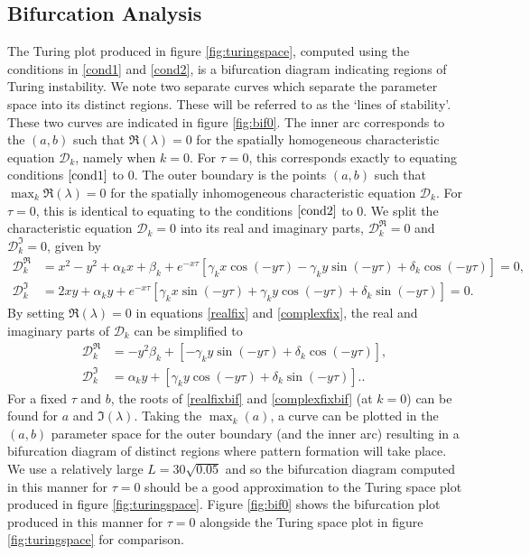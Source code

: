 \subsection{Bifurcation Analysis}\label{section:fixedbif}
The Turing plot produced in figure \ref{fig:turingspace}, computed using the conditions in \eqref{cond1} and \eqref{cond2}, is a bifurcation diagram indicating regions of Turing instability. We note two separate curves which separate the parameter space into its distinct regions. These will be referred to as the `lines of stability'.
These two curves are indicated in figure \ref{fig:bif0}. The inner arc corresponds to the $(a,b)$ such that $\Re(\lambda)=0$ for the
spatially homogeneous characteristic equation $\mathcal{D}_k$, namely when $k=0$. For $\tau=0$, this corresponds exactly to equating conditions $\eqref{cond1}$ to 0. The outer boundary is the points $(a,b)$ such that $\max_k\Re(\lambda)=0$ for the spatially inhomogeneous characteristic equation $\mathcal{D}_k$. For $\tau=0$, this is identical to equating to the conditions $\eqref{cond2}$ to 0. We split the characteristic equation $\mathcal{D}_k=0$ into its real and imaginary parts, $\mathcal{D}_k^{\Re}=0$ and $\mathcal{D}_k^{\Im}=0$, given by
\begin{align}\label{realfix}
\mathcal{D}_k^{\Re}&=x^2-y^2+\alpha_kx+\beta_k+e^{-x\tau}[\gamma_kx\cos(-y\tau)-\gamma_ky\sin(-y\tau)+\delta_k\cos(-y\tau)]=0,\\
\mathcal{D}_k^{\Im}&=2xy+\alpha_ky+e^{-x\tau}[\gamma_kx\sin(-y\tau)+\gamma_ky\cos(-y\tau)+\delta_k\sin(-y\tau)]=0.\label{complexfix}
\end{align}
By setting $\Re(\lambda)=0$ in equations \eqref{realfix} and \eqref{complexfix}, the real and imaginary parts of $\mathcal{D}_k$ can be simplified to
\begin{align}\label{realfixbif}
  \mathcal{D}_k^{\Re}&=-y^2\beta_k+[-\gamma_ky\sin(-y\tau)+\delta_k\cos(-y\tau)],\\
  \mathcal{D}_k^{\Im}&=\alpha_ky+[\gamma_ky\cos(-y\tau)+\delta_k\sin(-y\tau)].\label{complexfixbif}.
\end{align}
For a fixed $\tau$ and $b$, the roots of \eqref{realfixbif} and \eqref{complexfixbif} (at $k=0$) can be found for $a$ and $\Im(\lambda)$.
Taking the $\max_k(a)$, a curve can be plotted in the $(a,b)$ parameter space for the outer boundary (and the inner arc) resulting in a bifurcation diagram of distinct regions where pattern formation will take place. We use a relatively large $L=30\sqrt{0.05}$ and so the bifurcation diagram computed in this manner for $\tau=0$ should be a good approximation to the Turing space plot produced in figure \ref{fig:turingspace}. Figure \ref{fig:bif0} shows the bifurcation plot produced in this manner for $\tau=0$ alongside the Turing space plot in figure \ref{fig:turingspace} for comparison.

